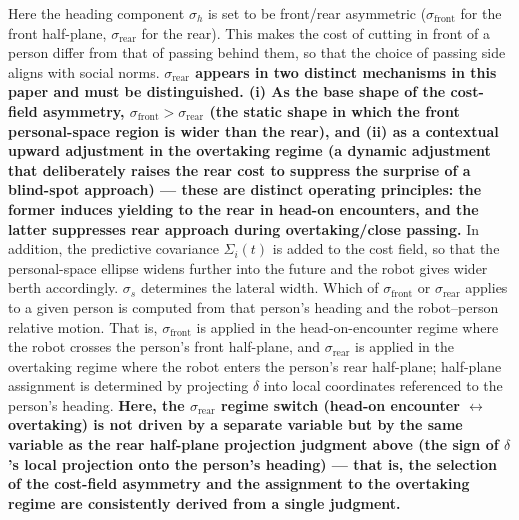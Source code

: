 \begin{itemize}
Here the heading component $\sigma_h$ is set to be front/rear asymmetric ($\sigma_{\text{front}}$ for the front half-plane, $\sigma_{\text{rear}}$ for the rear). This makes the cost of cutting in front of a person differ from that of passing behind them, so that the choice of passing side aligns with social norms. \textbf{$\sigma_{\text{rear}}$ appears in two distinct mechanisms in this paper and must be distinguished. (i) As the base shape of the cost-field asymmetry, $\sigma_{\text{front}} > \sigma_{\text{rear}}$ (the static shape in which the front personal-space region is wider than the rear), and (ii) as a contextual upward adjustment in the overtaking regime (a dynamic adjustment that deliberately raises the rear cost to suppress the surprise of a blind-spot approach) --- these are distinct operating principles: the former induces yielding to the rear in head-on encounters, and the latter suppresses rear approach during overtaking/close passing.} In addition, the predictive covariance $\Sigma_i(t)$ is added to the cost field, so that the personal-space ellipse widens further into the future and the robot gives wider berth accordingly. $\sigma_s$ determines the lateral width. Which of $\sigma_{\text{front}}$ or $\sigma_{\text{rear}}$ applies to a given person is computed from that person's heading and the robot--person relative motion. That is, $\sigma_{\text{front}}$ is applied in the head-on-encounter regime where the robot crosses the person's front half-plane, and $\sigma_{\text{rear}}$ is applied in the overtaking regime where the robot enters the person's rear half-plane; half-plane assignment is determined by projecting $\delta$ into local coordinates referenced to the person's heading. \textbf{Here, the $\sigma_{\text{rear}}$ regime switch (head-on encounter $\leftrightarrow$ overtaking) is not driven by a separate variable but by the same variable as the rear half-plane projection judgment above (the sign of $\delta$'s local projection onto the person's heading) --- that is, the selection of the cost-field asymmetry and the assignment to the overtaking regime are consistently derived from a single judgment.}


\end{itemize}
